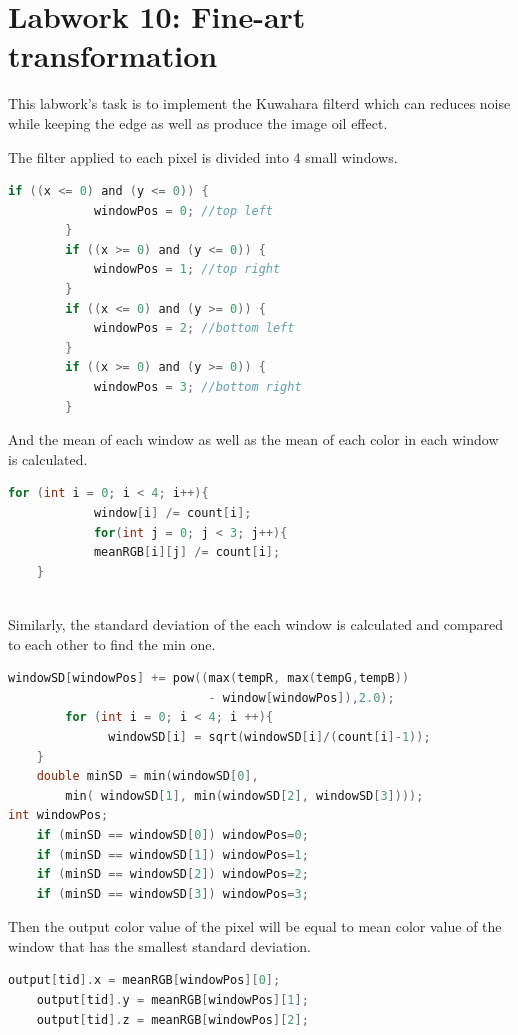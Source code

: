 \documentclass{article}
\begin{document}
\section{Labwork 10: Fine-art transformation}
This labwork's task is to implement the Kuwahara filterd which can reduces noise while keeping the edge as well as produce the image oil effect.

The filter applied to each pixel is divided into 4 small windows.

\begin{lstlisting}[language=C]
        if ((x <= 0) and (y <= 0)) {
            windowPos = 0; //top left
        }
        if ((x >= 0) and (y <= 0)) {
            windowPos = 1; //top right
        }
        if ((x <= 0) and (y >= 0)) {
            windowPos = 2; //bottom left
        }
        if ((x >= 0) and (y >= 0)) {
            windowPos = 3; //bottom right
        }
\end{lstlisting}
And the mean of each window as well as the mean of each color in each window is calculated.

\begin{lstlisting}[language=C]
        for (int i = 0; i < 4; i++){
        	window[i] /= count[i];
        	for(int j = 0; j < 3; j++){ 
    		meanRGB[i][j] /= count[i];
	}	
	
\end{lstlisting}

Similarly, the standard deviation of the each window is calculated and compared to each other to find the min one.

\begin{lstlisting}[language=C]
 windowSD[windowPos] += pow((max(tempR, max(tempG,tempB)) 
                            - window[windowPos]),2.0);
        for (int i = 0; i < 4; i ++){
              windowSD[i] = sqrt(windowSD[i]/(count[i]-1));
	}	
    double minSD = min(windowSD[0], 
        min( windowSD[1], min(windowSD[2], windowSD[3])));
int windowPos;
	if (minSD == windowSD[0]) windowPos=0;
	if (minSD == windowSD[1]) windowPos=1;
	if (minSD == windowSD[2]) windowPos=2;
	if (minSD == windowSD[3]) windowPos=3;
\end{lstlisting}
 Then the output color value of the pixel will be equal to mean color value of the window that has the smallest standard deviation.

\begin{lstlisting}[language=C]
        output[tid].x = meanRGB[windowPos][0];
	output[tid].y = meanRGB[windowPos][1];
	output[tid].z = meanRGB[windowPos][2];
\end{lstlisting}
\end{document}
